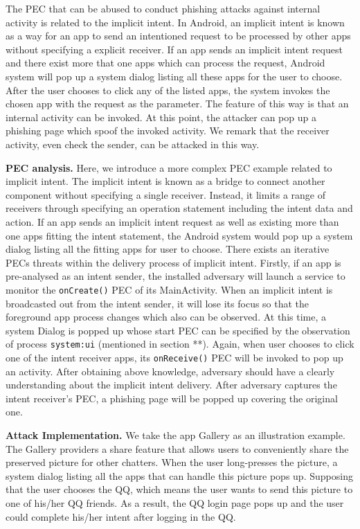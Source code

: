 The PEC that can be abused to conduct phishing attacks against internal activity is related to the implicit intent. 
In Android, an implicit intent is known as a 
way for an app to send an intentioned request
to be processed by other apps 
without specifying a explicit receiver. 
If an app sends an implicit intent request and there exist more that one apps which can process the request, 
Android system will pop up a system dialog listing all these apps for the user to choose. 
After the 
user chooses to click any of the listed apps, 
the system invokes the chosen app with the request as the parameter. 
The feature of this way is that an internal activity can be invoked.  
At this point, the attacker can pop up a phishing page which spoof the invoked activity. 
We remark that the receiver activity, even check the sender, can be attacked in this way. 





\textbf{PEC analysis.} Here, we introduce a more complex PEC example related to implicit intent. The implicit intent is known as a bridge to connect another component without specifying a single receiver. Instead, it limits a range of receivers through specifying an operation statement including the intent data and action. If an app sends an implicit intent request as well as existing more than one apps fitting the intent statement, the Android system would pop up a system dialog listing all the fitting apps for user to choose. There exists an iterative PECs threats within the delivery process of implicit intent. Firstly, if an app is pre-analysed as an intent sender, the installed adversary will launch a service to monitor the \texttt{onCreate()} PEC of its MainActivity. When an implicit intent is broadcasted out from the intent sender, it will lose its focus so that the foreground app process changes which also can be observed. At this time, a system Dialog is popped up whose start PEC can be specified by the observation of process \texttt{system:ui} (mentioned in section **). Again, when user chooses to click one of the intent receiver apps, its \texttt{onReceive()} PEC will be invoked to pop up an activity. After obtaining above knowledge, adversary should have a clearly understanding about the implicit intent delivery. After adversary captures the intent receiver's PEC, a phishing page will be popped up covering the original one.


\textbf{Attack Implementation.}
We take the app Gallery as an illustration example. The Gallery providers a share feature that allows users to conveniently share the preserved picture for other chatters. When the user long-presses the picture, a system dialog listing all the apps that can handle this picture pops up. Supposing that the user chooses the QQ, which means the user wants to send this picture to one of his/her QQ friends. As a result, the QQ login page pops up and the user could complete his/her intent after logging in the QQ.

